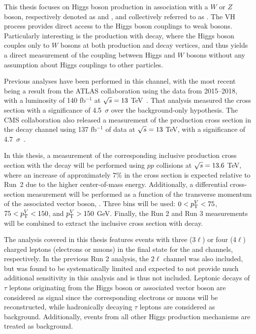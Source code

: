 This thesis focuses on Higgs boson production in association with a $W$ or $Z$ boson, respectively denoted as \wh{} and \zh{}, and collectively referred to as \vh{}. The VH process provides direct access to the Higgs boson couplings to weak bosons. Particularly interesting is the \wh{} production with \hww{} decay, where the Higgs boson couples only to $W$ bosons at both production and decay vertices, and thus yields a direct measurement of the coupling between Higgs and $W$ bosons without any assumption about Higgs couplings to other particles.

Previous analyses have been performed in this channel, with the most recent being a result from the ATLAS collaboration using the data from 2015--2018, with a luminosity of 140 fb$^{-1}$ at $\sqrt{s} = 13$ TeV~\cite{ATLAS:2025abg}. That analysis measured the \vh{} cross section with a significance of 4.5~$\sigma$ over the background-only hypothesis. The CMS collaboration also released a measurement of the \vh{} production cross section in the \hww{} decay channel using 137 fb$^{-1}$ of data at $\sqrt{s} = 13$ TeV, with a significance of 4.7~$\sigma$~\cite{CMS:2021ixs}.

In this thesis, a measurement of the corresponding inclusive production cross section with the \hww{} decay will be performed using $pp$ collisions at $\sqrt{s} = 13.6$ TeV, where an increase of approximately 7\% in the cross section is expected relative to Run~2 due to the higher center-of-mass energy. Additionally, a differential cross-section measurement will be performed as a function of the transverse momentum of the associated vector boson, \ptv{}. Three \ptv{} bins will be used: $0 < p_{\mathrm{T}}^{V} < 75$, $75 < p_{\mathrm{T}}^{V} < 150$, and $p_{\mathrm{T}}^{V} > 150$ GeV. Finally, the Run 2 and Run 3 measurements will be combined to extract the inclusive \vh{} cross section with \hww{} decay.

The analysis covered in this thesis features events with three (3$\ell$) or four (4$\ell$) charged leptons (electrons or muons) in the final state for the \wh{} and \zh{} channels, respectively. In the previous Run 2 analysis, the $2\ell$ channel was also included, but was found to be systematically limited and expected to not provide much additional sensitivity in this analysis and is thus not included. Leptonic decays of $\tau$ leptons originating from the Higgs boson or associated vector boson are considered as signal since the corresponding electrons or muons will be reconstructed, while hadronically decaying $\tau$ leptons are considered as background. Additionally, events from all other Higgs production mechanisms are treated as background. 

